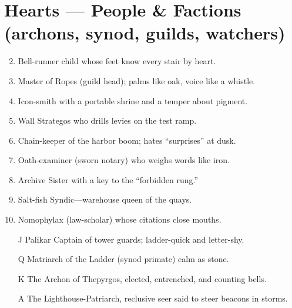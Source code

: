 \section*{Hearts --- People \& Factions (archons, synod, guilds, watchers)}
\label{sec:thepyrgos-people}
\begin{enumerate}
\setcounter{enumi}{1}
\item Bell-runner child whose feet know every stair by heart.
\item Master of Ropes (guild head); palms like oak, voice like a whistle.
\item Icon-smith with a portable shrine and a temper about pigment.
\item Wall Strategos who drills levies on the test ramp.
\item Chain-keeper of the harbor boom; hates ``surprises'' at dusk.
\item Oath-examiner (sworn notary) who weighs words like iron.
\item Archive Sister with a key to the ``forbidden rung.''
\item Salt-fish Syndic---warehouse queen of the quays.
\item Nomophylax (law-scholar) whose citations close mouths.
\item[J] Palikar Captain of tower guards; ladder-quick and letter-shy.
\item[Q] Matriarch of the Ladder (synod primate) calm as stone.
\item[K] The Archon of Thepyrgos, elected, entrenched, and counting bells.
\item[A] The Lighthouse-Patriarch, reclusive seer said to steer beacons in storms.
\end{enumerate}

